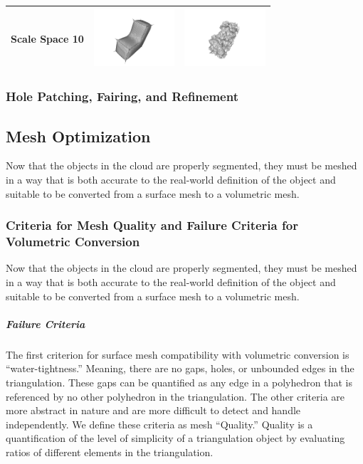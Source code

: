 \documentclass[12pt]{drexelthesis}
\begin{document}
\begin{table}
\begin{centering}
\begin{tabular}{ | c | c | c | }
\hline
Scale Space 10 & \includegraphics[width=3cm]{scalespace/clean/scalespace10.png} & \includegraphics[width=3cm]{scalespace/10pnoise/scale10.png}
\\
\hline
\end{tabular}
\end{centering}
\end{table}


 

\subsubsection{Hole Patching, Fairing, and Refinement}

\subsection{Mesh Optimization}
Now that the objects in the cloud are properly segmented, they must be meshed in a way that is both accurate to the real-world definition of the object and suitable to be converted from a surface mesh to a volumetric mesh.

\subsubsection{Criteria for Mesh Quality and Failure Criteria for Volumetric Conversion}
Now that the objects in the cloud are properly segmented, they must be meshed in a way that is both accurate to the real-world definition of the object and suitable to be converted from a surface mesh to a volumetric mesh.

\subparagraph{Failure Criteria}
The first criterion for surface mesh compatibility with volumetric conversion is “water-tightness.” Meaning, there are no gaps, holes, or unbounded edges in the triangulation. These gaps can be quantified as any edge in a polyhedron that is referenced by no other polyhedron in the triangulation.
The other criteria are more abstract in nature and are more difficult to detect and handle independently. We define these criteria as mesh “Quality.” Quality is a quantification of the level of simplicity of a triangulation object by evaluating ratios of different elements in the triangulation.
\end{document}
